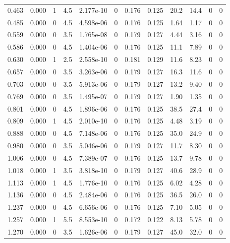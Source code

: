\documentclass[preview]{standalone}
\begin{document}
{{\begin{tabular}{L{1.2cm}C{1.2cm} C{0.3cm}C{0.5cm} C{1.4cm}C{1.4cm} C{1.4cm}C{1.4cm} C{1.6cm}C{1.6cm} C{1.6cm}C{1.6cm}}
  0.463  &  0.000  & 1     & 4.5 &  2.177e-10  & 0  &  0.176&   0.125& 20.2 & 14.4   &  0 & 0  \\ 
  0.485  &  0.000  & 0     & 4.5 &  4.598e-06  & 0  &  0.176&   0.125& 1.64 & 1.17   &  0 & 0  \\ 
  0.559  &  0.000  & 0     & 3.5 &  1.765e-08  & 0  &  0.179&   0.127& 4.44 & 3.16   &  0 & 0  \\ 
  0.586  &  0.000  & 0     & 4.5 &  1.404e-06  & 0  &  0.176&   0.125& 11.1 & 7.89   &  0 & 0  \\ 
  0.630  &  0.000  & 1     & 2.5 &  2.558e-10  & 0  &  0.181&   0.129& 11.6 & 8.23   &  0 & 0  \\ 
  0.657  &  0.000  & 0     & 3.5 &  3.263e-06  & 0  &  0.179&   0.127& 16.3 & 11.6   &  0 & 0  \\ 
  0.703  &  0.000  & 0     & 3.5 &  5.913e-06  & 0  &  0.179&   0.127& 13.2 & 9.40   &  0 & 0  \\ 
  0.769  &  0.000  & 0     & 3.5 &  1.495e-07  & 0  &  0.179&   0.127& 1.90 & 1.35   &  0 & 0  \\ 
  0.801  &  0.000  & 0     & 4.5 &  1.896e-06  & 0  &  0.176&   0.125& 38.5 & 27.4   &  0 & 0  \\ 
  0.809  &  0.000  & 1     & 4.5 &  2.010e-10  & 0  &  0.176&   0.125& 4.48 & 3.19   &  0 & 0  \\ 
  0.888  &  0.000  & 0     & 4.5 &  7.148e-06  & 0  &  0.176&   0.125& 35.0 & 24.9   &  0 & 0  \\ 
  0.980  &  0.000  & 0     & 3.5 &  5.046e-06  & 0  &  0.179&   0.127& 11.7 & 8.30   &  0 & 0  \\ 
  1.006  &  0.000  & 0     & 4.5 &  7.389e-07  & 0  &  0.176&   0.125& 13.7 & 9.78   &  0 & 0  \\ 
  1.018  &  0.000  & 1     & 3.5 &  3.818e-10  & 0  &  0.179&   0.127& 40.6 & 28.9   &  0 & 0  \\ 
  1.113  &  0.000  & 1     & 4.5 &  1.776e-10  & 0  &  0.176&   0.125& 6.02 & 4.28   &  0 & 0  \\ 
  1.136  &  0.000  & 0     & 4.5 &  2.484e-06  & 0  &  0.176&   0.125& 36.5 & 26.0   &  0 & 0  \\ 
  1.237  &  0.000  & 0     & 4.5 &  6.656e-06  & 0  &  0.176&   0.125& 7.10 & 5.05   &  0 & 0  \\ 
  1.257  &  0.000  & 1     & 5.5 &  8.553e-10  & 0  &  0.172&   0.122& 8.13 & 5.78   &  0 & 0  \\ 
  1.270  &  0.000  & 0     & 3.5 &  1.626e-06  & 0  &  0.179&   0.127& 45.0 & 32.0   &  0 & 0  \\ 

\end{tabular}}}
\end{document}
